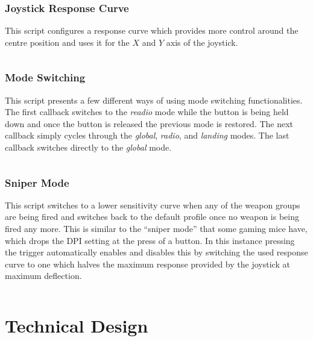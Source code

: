 \documentclass[a4, 10pt]{article}
\begin{document}
\inputminted[xleftmargin=2em]{python}{examples/keyboard_throttle.py}


\subsubsection{Joystick Response Curve}

This script configures a response curve which provides more control
around the centre position and uses it for the $X$ and $Y$ axis of the
joystick.

\inputminted[xleftmargin=2em]{python}{examples/response_curve.py}


\subsubsection{Mode Switching}

This script presents a few different ways of using mode switching
functionalities. The first callback switches to the \emph{readio} mode
while the button is being held down and once the button is released the
previous mode is restored. The next callback simply cycles through the
\emph{global}, \emph{radio}, and \emph{landing} modes. The last callback
switches directly to the \emph{global} mode.

\inputminted[xleftmargin=2em]{python}{examples/mode_switching.py}


\subsubsection{Sniper Mode}

This script switches to a lower sensitivity curve when any of the
weapon groups are being fired and switches back to the default profile
once no weapon is being fired any more. This is similar to the ``sniper
mode'' that some gaming mice have, which drops the DPI setting at the
press of a button. In this instance pressing the trigger automatically
enables and disables this by switching the used response curve to one
which halves the maximum response provided by the joystick at maximum
deflection.

\inputminted[xleftmargin=2em]{python}{examples/sniper_mode.py}



\section{Technical Design}
\label{sec:technical_design}
\end{document}
